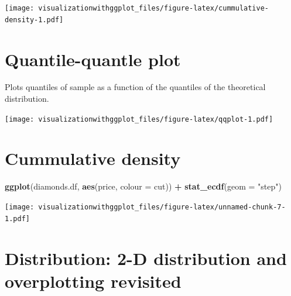 \documentclass[]{krantz}
\makeatletter
\newenvironment{Shaded}{\begin{snugshade}}{\end{snugshade}}
\newcommand{\DataTypeTok}[1]{\textcolor[rgb]{0.13,0.29,0.53}{#1}}
\newcommand{\KeywordTok}[1]{\textcolor[rgb]{0.13,0.29,0.53}{\textbf{#1}}}
\newcommand{\NormalTok}[1]{#1}
\newcommand{\OperatorTok}[1]{\textcolor[rgb]{0.81,0.36,0.00}{\textbf{#1}}}
\newcommand{\StringTok}[1]{\textcolor[rgb]{0.31,0.60,0.02}{#1}}
\newenvironment{kframe}{%
\medskip{}
\setlength{\fboxsep}{.8em}
 \def\at@end@of@kframe{}%
 \ifinner\ifhmode%
  \def\at@end@of@kframe{\end{minipage}}%
  \begin{minipage}{\columnwidth}%
 \fi\fi%
 \def\FrameCommand##1{\hskip\@totalleftmargin \hskip-\fboxsep
 \colorbox{shadecolor}{##1}\hskip-\fboxsep
     \hskip-\linewidth \hskip-\@totalleftmargin \hskip\columnwidth}%
 \MakeFramed {\advance\hsize-\width
   \@totalleftmargin\z@ \linewidth\hsize
   \@setminipage}}%
 {\par\unskip\endMakeFramed%
 \at@end@of@kframe}
\renewenvironment{Shaded}{\begin{kframe}}{\end{kframe}}
\makeatother
\begin{document}
\texttt{[image: visualizationwithggplot\_files/figure-latex/cummulative-density-1.pdf]}

\hypertarget{quantile-quantle-plot}{%
\section{Quantile-quantle plot}\label{quantile-quantle-plot}}

Plots quantiles of sample as a function of the quantiles of the theoretical distribution.

\begin{Shaded}
\end{Shaded}

\texttt{[image: visualizationwithggplot\_files/figure-latex/qqplot-1.pdf]}

\hypertarget{cummulative-density-1}{%
\section{Cummulative density}\label{cummulative-density-1}}

\begin{Shaded}
\begin{Highlighting}[]
\KeywordTok{ggplot}\NormalTok{(diamonds.df, }\KeywordTok{aes}\NormalTok{(price, }\DataTypeTok{colour =}\NormalTok{ cut)) }\OperatorTok{+}\StringTok{ }
\StringTok{  }\KeywordTok{stat_ecdf}\NormalTok{(}\DataTypeTok{geom =} \StringTok{"step"}\NormalTok{)}
\end{Highlighting}
\end{Shaded}

\texttt{[image: visualizationwithggplot\_files/figure-latex/unnamed-chunk-7-1.pdf]}

\hypertarget{distribution-2-d-distribution-and-overplotting-revisited}{%
\section{Distribution: 2-D distribution and overplotting revisited}\label{distribution-2-d-distribution-and-overplotting-revisited}}
\end{document}
